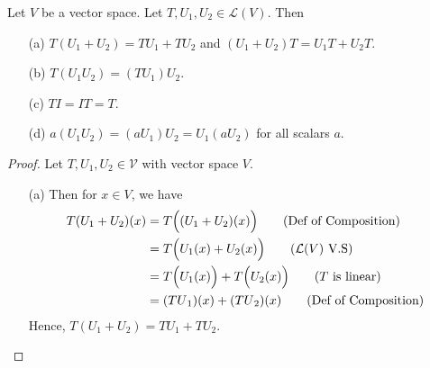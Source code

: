 \begin{theorem}\label{Properties of Compositions}
    Let \( V  \) be a vector space. Let \( T, {U}_{1}, {U}_{2} \in \mathcal{L}(V) \). Then 
    \begin{enumerate}
        \item[(a)] \( T({U}_{1} + {U}_{2}) = {TU}_{1} + {TU}_{2}  \) and \( ({U}_{1} + {U}_{2}) T = {U}_{1} T + {U}_{2} T  \).
        \item[(b)] \( T({U}_{1} {U}_{2}) = ({TU}_{1}){U}_{2} \).
        \item[(c)] \( TI = IT = T  \).
        \item[(d)] \( a({U}_{1}{U}_{2}) = ({aU}_{1}) {U}_{2} = {U}_{1} ({aU}_{2}) \) for all scalars \( a \). 
    \end{enumerate}
\end{theorem}
\begin{proof}
    Let \( T, {U}_{1}, {U}_{2} \in \mathcal{V} \) with vector space \( V  \). 
    \begin{enumerate}
        \item[(a)] Then for \( x \in V  \), we have
    \begin{align*}
        T({U}_{1} + {U}_{2})(x) &= T \Big( ({U}_{1} + {U}_{2})(x) \Big) \tag{Def of Composition}   \\
                             &= T \Big( {U}_{1}(x) + {U}_{2}(x) \Big) \tag{\( \mathcal{L}(V) \) V.S} \\
                             &= T \Big( {U}_{1}(x) \Big) + T \Big( {U}_{2}(x) \Big) \tag{\( T \) is linear} \\  
                             &= ({TU}_{1})(x) +  ({TU}_{2})(x) \tag{Def of Composition} \\
    \end{align*}
    Hence, \( T({U}_{1} + {U}_{2}) = {TU}_{1} + {TU}_{2} \).
        

\end{enumerate}
\end{proof}
